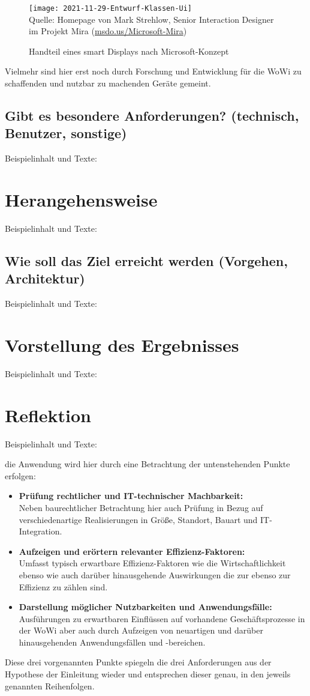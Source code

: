 \begin{figure}[H]
	\caption{Handteil eines smart Displays nach Microsoft-Konzept}\label{fig:HandteilMSsmartDisplay}
	\texttt{[image: 2021-11-29-Entwurf-Klassen-Ui]}
	\\
	Quelle: Homepage von Mark Strehlow, Senior Interaction Designer\\ im Projekt Mira (\href{https://msdo.us/Microsoft-Mira}{msdo.us/Microsoft-Mira})
\end{figure}

Vielmehr sind hier erst noch durch Forschung und Entwicklung für die \ac{WoWi} zu schaffenden und nutzbar zu machenden Geräte gemeint.


\subsection{Gibt es besondere Anforderungen? (technisch, Benutzer, sonstige)}
Beispielinhalt und Texte:

\newpage
\section{Herangehensweise}
Beispielinhalt und Texte:

\subsection{Wie soll das Ziel erreicht werden (Vorgehen, Architektur)}
Beispielinhalt und Texte:

\newpage
\section{Vorstellung des Ergebnisses}
Beispielinhalt und Texte:

\newpage
\section{Reflektion}
Beispielinhalt und Texte:

 die Anwendung wird hier durch eine Betrachtung  der untenstehenden Punkte erfolgen: 
\begin{itemize}
	\item \textbf{Prüfung rechtlicher und IT-technischer Machbarkeit:}
	\\ Neben baurechtlicher Betrachtung hier auch Prüfung in Bezug auf verschiedenartige Realisierungen in Größe, Standort, Bauart und IT-Integration.
	\item \textbf{Aufzeigen und erörtern relevanter Effizienz-Faktoren:}
	\\ Umfasst typisch erwartbare Effizienz-Faktoren wie die Wirtschaftlichkeit ebenso wie auch darüber hinausgehende Auswirkungen die zur ebenso zur Effizienz zu zählen sind.
	\item \textbf{Darstellung möglicher Nutzbarkeiten und Anwendungsfälle:}
	\\ Ausführungen zu erwartbaren Einflüssen auf vorhandene Geschäftsprozesse in der \ac{WoWi} aber auch durch Aufzeigen von neuartigen und darüber hinausgehenden Anwendungsfällen und -bereichen.
\end{itemize}

Diese drei vorgenannten Punkte spiegeln die drei Anforderungen aus der Hypothese der Einleitung wieder und entsprechen dieser genau, in den jeweils genannten Reihenfolgen. 


